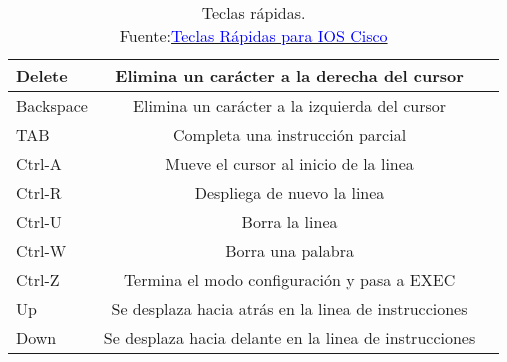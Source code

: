 \begin{table}[h]
\begin{footnotesize}
\begin{center}
\begin{tabular}{|l|c|r|}
	\hline
	Delete & Elimina un carácter a la derecha del cursor\\
	\hline
    Backspace & Elimina un carácter a la izquierda del cursor\\
	\hline
    TAB & Completa una instrucción parcial\\
	\hline
    Ctrl-A & Mueve el cursor al inicio de la linea\\
    \hline
    Ctrl-R & Despliega de nuevo la linea\\
    \hline
    Ctrl-U & Borra la linea\\
    \hline
    Ctrl-W & Borra una palabra\\
    \hline
    Ctrl-Z & Termina el modo configuración y pasa a EXEC\\
    \hline
    Up & Se desplaza hacia atrás en la linea de instrucciones\\
    \hline
    Down & Se desplaza hacia delante en la linea de instrucciones\\
    \hline
\end{tabular}
\end{center}
\caption[Teclas rápidas para IOS Cisco]{Teclas rápidas.\\Fuente:\href{http://www.imd.guru/redes/cisco_ios/teclas-rapidas-en-el-cli-de-cisco.html}{\textcolor{blue}{Teclas Rápidas para IOS Cisco}}}
\label{tab:Tablateclasrapidas}
\end{footnotesize}
\end{table}
